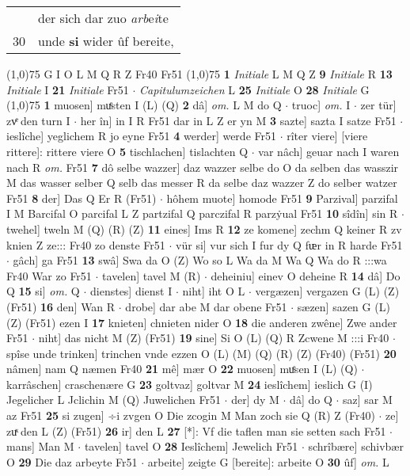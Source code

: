 \documentclass[8pt,a4paper,notitlepage]{article}
\begin{document}
\begin{table}[ht]
\begin{minipage}[t]{0.5\linewidth}
\begin{tabular}{rl}
 & der sich dar zuo \textit{arb}e\textit{i}te\\ 
30 & unde \textbf{si} wider ûf bereite,\\ 
\end{tabular}
\scriptsize
\line(1,0){75} \newline
G I O L M Q R Z Fr40 Fr51 \newline
\line(1,0){75} \newline
\textbf{1} \textit{Initiale} L M Q Z  \textbf{9} \textit{Initiale} R  \textbf{13} \textit{Initiale} I  \textbf{21} \textit{Initiale} Fr51   $\cdot$ \textit{Capitulumzeichen} L  \textbf{25} \textit{Initiale} O  \textbf{28} \textit{Initiale} G  \newline
\line(1,0){75} \newline
\textbf{1} muosen] muͤsten I (L) (Q) \textbf{2} dâ] \textit{om.} L M do Q  $\cdot$ truoc] \textit{om.} I  $\cdot$ zer tür] zvͤ den turn I  $\cdot$ her în] in I R Fr51 dar in L Z er yn M \textbf{3} sazte] sazta I satze Fr51  $\cdot$ ieslîche] yeglichem R jo eyne Fr51 \textbf{4} werder] werde Fr51  $\cdot$ rîter viere] [viere rittere]: rittere viere O \textbf{5} tischlachen] tislachten Q  $\cdot$ var nâch] geuar nach I waren nach R \textit{om.} Fr51 \textbf{7} dô selbe wazzer] daz wazzer selbe do O da selben das wasszir M das wasser selber Q selb das messer R da selbe daz wazzer Z do selber watzer Fr51 \textbf{8} der] Das Q Er R (Fr51)  $\cdot$ hôhem muote] homode Fr51 \textbf{9} Parzival] parzifal I M Barcifal O parcifal L Z partzifal Q parczifal R parzẏual Fr51 \textbf{10} sîdîn] sin R  $\cdot$ twehel] tweln M (Q) (R) (Z) \textbf{11} eines] Ims R \textbf{12} ze komene] zechm Q keiner R zv knien Z ze::: Fr40 zo denste Fr51  $\cdot$ vür si] vur sich I fur dy Q fᵫr in R harde Fr51  $\cdot$ gâch] ga Fr51 \textbf{13} swâ] Swa da O (Z) Wo so L Wa da M Wa Q Wa do R :::wa Fr40 War zo Fr51  $\cdot$ tavelen] tavel M (R)  $\cdot$ deheiniu] einev O deheine R \textbf{14} dâ] Do Q \textbf{15} si] \textit{om.} Q  $\cdot$ dienstes] dienst I  $\cdot$ niht] iht O L  $\cdot$ vergæzen] vergazen G (L) (Z) (Fr51) \textbf{16} den] Wan R  $\cdot$ drobe] dar abe M dar obene Fr51  $\cdot$ sæzen] sazen G (L) (Z) (Fr51) ezen I \textbf{17} knieten] chnieten nider O \textbf{18} die anderen zwêne] Zwe ander Fr51  $\cdot$ niht] das nicht M (Z) (Fr51) \textbf{19} sine] Si O (L) (Q) R Zcwene M :::i Fr40  $\cdot$ spîse unde trinken] trinchen vnde ezzen O (L) (M) (Q) (R) (Z) (Fr40) (Fr51) \textbf{20} nâmen] nam Q næmen Fr40 \textbf{21} mê] mær O \textbf{22} muosen] muͤsen I (L) (Q)  $\cdot$ karrâschen] craschenære G \textbf{23} goltvaz] goltvar M \textbf{24} ieslîchem] ieslich G (I) Jegelicher L Jclichin M (Q) Juwelichen Fr51  $\cdot$ der] dy M  $\cdot$ dâ] do Q  $\cdot$ saz] sar M az Fr51 \textbf{25} si zugen] ÷i zvgen O Die zcogin M Man zoch sie Q (R) Z (Fr40)  $\cdot$ ze] zuͯ den L (Z) (Fr51) \textbf{26} ir] den L \textbf{27} [*]: Vf die taflen man sie setten sach Fr51  $\cdot$ mans] Man M  $\cdot$ tavelen] tavel O \textbf{28} Ieslîchem] Jewelich Fr51  $\cdot$ schrîbære] schivbær O \textbf{29} Die daz arbeyte Fr51  $\cdot$ arbeite] zeigte G [bereite]: arbeite O \textbf{30} ûf] \textit{om.} L \newline

\end{minipage}
\end{table}
\end{document}
